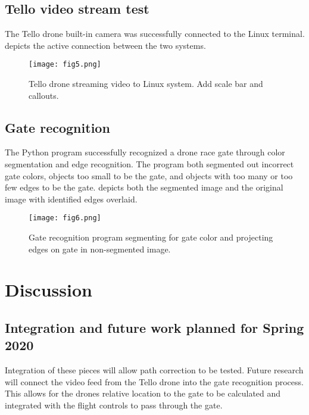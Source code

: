 \documentclass[onecolumn,10pt]{IEEEtran}
\begin{document}
\subsection{Tello video stream test}
The Tello drone built-in camera was successfully connected to the Linux terminal.  depicts the active connection between the two systems. 
\begin{figure}[h]
\begin{center}
\texttt{[image: fig5.png]}
\end{center}
\caption{Tello drone streaming video to Linux system. Add scale bar and callouts.}
\label{fig:5}
\end{figure}

\subsection{Gate recognition}
The Python program successfully recognized a drone race gate through color segmentation and edge recognition. The program both segmented out incorrect gate colors, objects too small to be the gate, and objects with too many or too few edges to be the gate.  depicts both the segmented image and the original image with identified edges overlaid.
\begin{figure}[t]
\begin{center}
\texttt{[image: fig6.png]}
\end{center}
\caption{Gate recognition program segmenting for gate color and projecting edges on gate in non-segmented image.}
\label{fig:6}
\end{figure}





\section{Discussion}
\subsection{Integration and future work planned for Spring 2020}
Integration of these pieces will allow path correction to be tested. Future research will connect the video feed from the Tello drone into the gate recognition process. This allows for the drones relative location to the gate to be calculated and integrated with the flight controls to pass through the gate.
\end{document}
